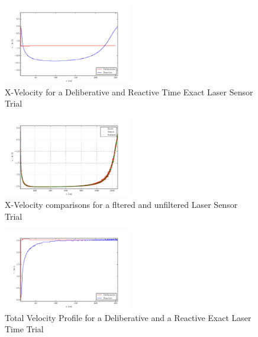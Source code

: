 \documentclass[journal, 10pt]{IEEEtran}
\begin{document}
\begin{figure}[tb]
\begin{center}
\includegraphics[width=0.5\textwidth]{figures/xVelocityClean.pdf}
\caption{X-Velocity for a Deliberative and Reactive Time Exact Laser Sensor Trial }
\label{xClean_velocity}
\end{center}
\end{figure}

\begin{figure}[tb]
\begin{center}
\includegraphics[width=0.5\textwidth]{figures/reactivelaservx.pdf}
\caption{X-Velocity comparisons for a fltered and unfiltered Laser Sensor Trial }
\label{xNoise_velocity}
\end{center}
\end{figure}

\begin{figure}[tb]
\begin{center}
\includegraphics[width=0.5\textwidth]{figures/TotalVelocityClean.pdf}
\caption{Total Velocity Profile for a Deliberative and a Reactive Exact Laser Time Trial }
\label{clean_total}
\end{center}
\end{figure}
\end{document}
